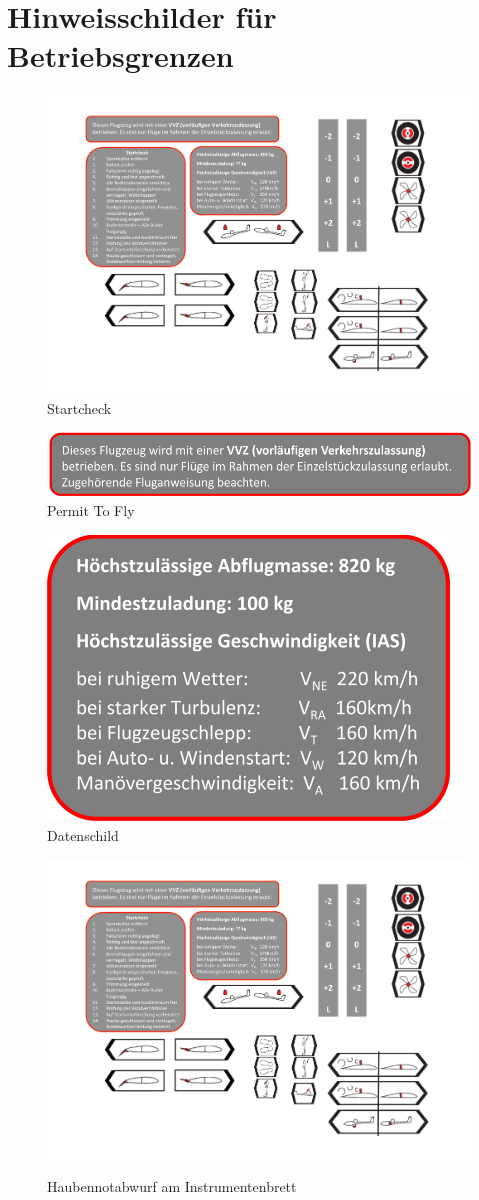 \section{Hinweisschilder für Betriebsgrenzen}

\begin{figure}[h]
\begin{center}
\includegraphics[width=.45\textwidth]{bilder/startcheck.pdf}
\caption*{Startcheck}
\end{center}
\end{figure}

\begin{figure}[h]
\begin{center}
\includegraphics[width=.9\textwidth]{bilder/vvz.pdf}
\caption*{Permit To Fly}
\end{center}
\end{figure}

\begin{figure}[H]
\begin{center}
\includegraphics[width=.45\textwidth]{bilder/datenschild.pdf}
\caption*{Datenschild}
\end{center}
\end{figure}

\begin{figure}[H]
\begin{center}
\includegraphics[width=.15\textwidth]{bilder/notabwurf.pdf}\\
\caption*{Haubennotabwurf am Instrumentenbrett}
\end{center}
\end{figure}

